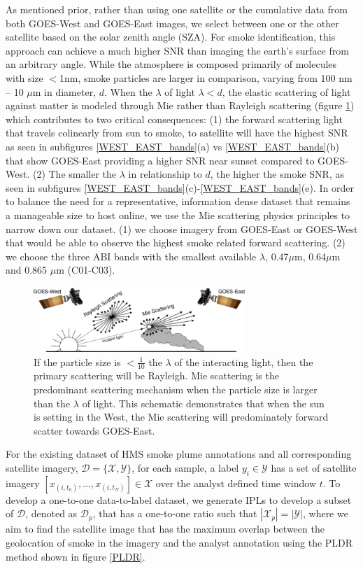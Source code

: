 \documentclass{article}
\begin{document}
As mentioned prior, rather than using one satellite or the cumulative data from both GOES-West and GOES-East images, we select between one or the other satellite based on the solar zenith angle (SZA). For smoke identification, this approach can achieve a much higher SNR than imaging the earth’s surface from an arbitrary angle. While the atmosphere is composed primarily of molecules with size \(<\)1nm, smoke particles are larger in comparison, varying from 100 nm -- 10 \(\mu\)m in diameter, \(d\). When the \(\lambda\) of light \(\lambda<d\), the elastic scattering of light against matter is modeled through Mie rather than Rayleigh scattering (figure \ref{mei}) which contributes to two critical consequences: (1) the forward scattering light that travels colinearly from sun to smoke, to satellite will have the highest SNR as seen in subfigures \ref{WEST_EAST_bands}(a) vs \ref{WEST_EAST_bands}(b) that show GOES-East providing a higher SNR near sunset compared to GOES-West. (2) The smaller the \(\lambda\) in relationship to \(d\), the higher the smoke SNR, as seen in subfigures \ref{WEST_EAST_bands}(c)-\ref{WEST_EAST_bands}(e). In order to balance the need for a representative, information dense dataset that remains a manageable size to host online, we use the Mie scattering physics principles to narrow down our dataset. (1) we choose imagery from GOES-East or GOES-West that would be able to observe the highest smoke related forward scattering. (2) we choose the three ABI bands with the smallest available \(\lambda\), 0.47\(\mu\)m, 0.64\(\mu\)m and 0.865 \(\mu\)m (C01-C03). 


\begin{figure}[!htb]
    \centering
    \includegraphics[width=8cm]{figures/mei_small.png}
    \caption{If the particle size is \(<\frac{1}{10}\) the \(\lambda\) of the interacting light, then the primary scattering will be Rayleigh. Mie scattering is the predominant scattering mechanism when the particle size is larger than the \(\lambda\) of light. This schematic demonstrates that when the sun is setting in the West, the Mie scattering will predominately forward scatter towards GOES-East.} \label{mei}
\end{figure}

For the existing dataset of HMS smoke plume annotations and all corresponding satellite imagery, \(\mathcal{D} = \{\mathcal{X}, \mathcal{Y}\}\), for each sample, a label \(y_i \in \mathcal{Y}\) has a set of satellite imagery \([x_{(i,t_0)},...,x_{(i,t_N)}] \in \mathcal{X}\) over the analyst defined time window \(t\). To develop a one-to-one data-to-label dataset, we generate IPLs to develop a subset of \(\mathcal{D}\), denoted as \(\mathcal{D}_p\), that has a one-to-one ratio such that \(|\mathcal{X}_p| = |\mathcal{Y}|\), where we aim to find the satellite image that has the maximum overlap between the geolocation of smoke in the imagery and the analyst annotation using the PLDR method shown in figure \ref{PLDR}.
\end{document}

